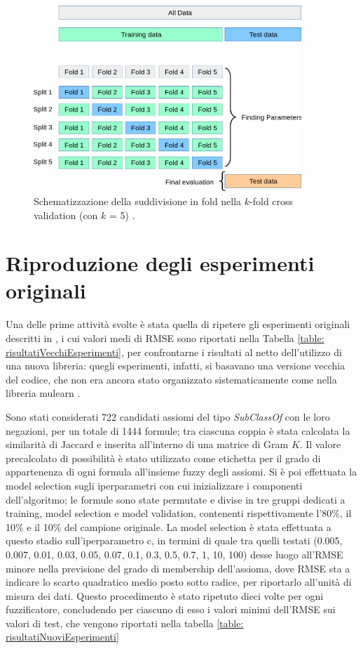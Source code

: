 \documentclass[12pt,a4paper]{report}
\begin{document}
\begin{figure}[h]	
\centering
\includegraphics[width=0.9\textwidth]{images/grid_search_cross_validation.png}
\caption{Schematizzazione della suddivisione in fold nella $k$-fold cross validation (con $k$ = 5) \cite{scikit-learn}.}
\label{scikitSchema}
\end{figure}

\section{Riproduzione degli esperimenti originali}
Una delle prime attività svolte è stata quella di ripetere gli esperimenti originali descritti in \cite{sacpaper}, i cui valori medi di RMSE sono riportati nella Tabella \ref{table: risultatiVecchiEsperimenti}, per confrontarne i risultati al netto dell'utilizzo di una nuova libreria: quegli esperimenti, infatti, si basavano una versione vecchia del codice, che non era ancora stato organizzato sistematicamente come nella libreria mulearn \cite{mulearn}.

Sono stati considerati 722 candidati assiomi del tipo \emph{SubClassOf} con le loro negazioni, per un totale di 1444 formule;  tra ciascuna coppia è stata calcolata la similarità di Jaccard e inserita all'interno di una matrice di Gram $K$.
Il valore precalcolato di possibilità è stato utilizzato come etichetta per il grado di appartenenza di ogni formula all'insieme fuzzy degli assiomi.
Si è poi effettuata la model selection sugli iperparametri con cui inizializzare i componenti dell'algoritmo; le formule sono state permutate e divise in tre gruppi dedicati a training, model selection e model validation, contenenti rispettivamente l'80\%, il 10\% e il 10\% del campione originale.
La model selection è stata effettuata a questo stadio sull'iperparametro c, in termini di quale tra quelli testati (0.005, 0.007, 0.01, 0.03, 0.05, 0.07, 0.1, 0.3, 0.5, 0.7, 1, 10, 100) desse luogo all'RMSE minore nella previsione del grado di membership dell'assioma, dove RMSE sta a indicare lo scarto quadratico medio posto sotto radice, per riportarlo all'unità di misura dei dati.
Questo procedimento è stato ripetuto dieci volte per ogni fuzzificatore, concludendo per ciascuno di esso i valori minimi dell'RMSE sui valori di test, che vengono riportati nella tabella \ref{table: risultatiNuoviEsperimenti}
\end{document}
